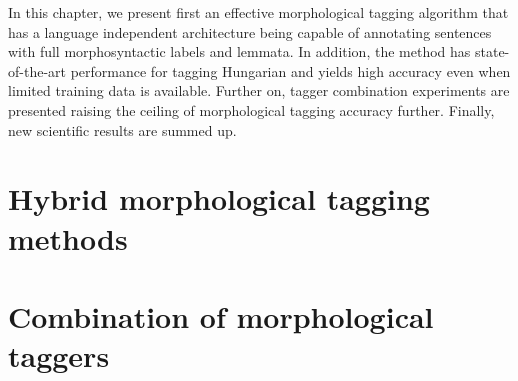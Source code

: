 In this chapter, we present first an effective morphological tagging algorithm that has a language independent architecture being capable of annotating sentences with full morphosyntactic labels and lemmata. 
In addition, the method has state-of-the-art performance for tagging Hungarian and yields high accuracy even when limited training data is available. 
Further on, tagger combination experiments are presented raising the ceiling of morphological tagging accuracy further. 
Finally, new scientific results are summed up.



\section{Hybrid morphological tagging methods}



\section{Combination of morphological taggers}


 
